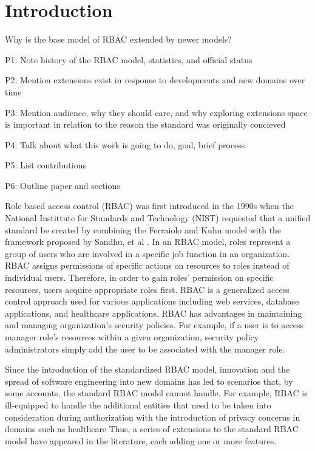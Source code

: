 \section{Introduction} \label{sec:introduction}

Why is the base model of RBAC extended by newer models?

P1: Note history of the RBAC model, statistics, and official status

P2: Mention extensions exist in response to developments and new domains over time

P3: Mention audience, why they should care, and why exploring extensions space is important in relation to the reason the standard was originally concieved

P4: Talk about what this work is going to do, goal, brief process

P5: List contributions

P6: Outline paper and sections


Role based access control (RBAC) was first introduced in the 1990s when the National Instittute for Standards and Technology (NIST) requested that a unified standard be created by combining the Ferraiolo and Kuhn model \cite{ferraiolokuhn} with the framework proposed by Sandhu, et al \cite{sandhu1996role}.  In an RBAC model, roles represent a group of users who are involved in a specific job function in an organization. RBAC assigns permissions of specific actions on resources to roles instead of individual users.  Therefore, in order to gain roles' permission on specific resources, users acquire appropriate roles first.  RBAC is a generalized access control approach used for various applications including web services, database applications, and healthcare applications.  RBAC has advantages in maintaining and managing organization's security policies.  For example, if a user is to access manager role's resources within a given organization, security policy administrators simply add the user to be associated with the manager role.

Since the introduction of the standardized RBAC model, innovation and the spread of software engineering into new domains has led to scenarios that, by some accounts, the standard RBAC model cannot handle.  For example, RBAC is ill-equipped to handle the additional entities that need to be taken into consideration during authorization with the introduction of privacy concerns in domains such as healthcare  Thus, a series of extensions to the standard RBAC model have appeared in the literature, each adding one or more features.

